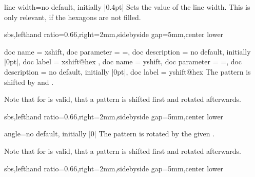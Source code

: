 \documentclass[a4paper,11pt]{article}
\begin{document}
\begin{myvoid}
\begin{docPatternKey}[][doc label=line width@hex]{line width}{=}{no default, initially |0.4pt|}
  Sets the  value of the line width.
  This is only relevant, if the hexagons are not filled.
\begin{dispExample*}{sbs,lefthand ratio=0.66,right=2mm,sidebyside gap=5mm,center lower}
\end{dispExample*}
\end{docPatternKey}



\begin{docPatternKeys}
  {
    {
      doc name        = xshift,
      doc parameter   = {=},
      doc description = {no default, initially |0pt|},
      doc label       = xshift@hex
    },
    {
      doc name        = yshift,
      doc parameter   = {=},
      doc description = {no default, initially |0pt|},
      doc label       = yshift@hex
    }
  }
  The pattern is shifted by  and .
  \par
  Note that for  is valid, that a pattern is shifted first and rotated afterwards.
\begin{dispExample*}{sbs,lefthand ratio=0.66,right=2mm,sidebyside gap=5mm,center lower}
\end{dispExample*}
\end{docPatternKeys}



\begin{docPatternKey}[][doc label=angle@hex]{angle}{=}{no default, initially |0|}
  The pattern is rotated by the given .
  \par
  Note that for  is valid, that a pattern is shifted first and rotated afterwards.
\begin{dispExample*}{sbs,lefthand ratio=0.66,right=2mm,sidebyside gap=5mm,center lower}
\end{dispExample*}
\end{docPatternKey}




\end{myvoid}
\end{document}
